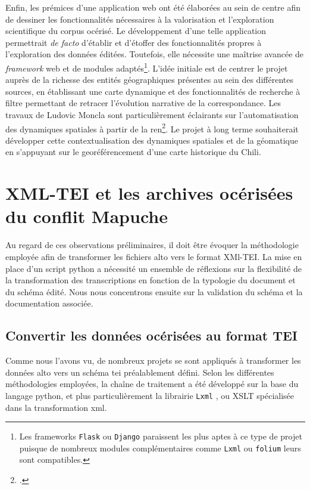 	Enfin, les prémices d'une application web ont été élaborées au sein de centre afin de dessiner les fonctionnalités nécessaires à la valorisation et l'exploration scientifique du corpus océrisé. Le développement d'une telle application permettrait \textit{de facto} d'établir et d'étoffer des fonctionnalités propres à l'exploration des données éditées. Toutefois, elle nécessite une maîtrise avancée de \textit{framework} web et de modules adaptés\footnote{Les frameworks \texttt{Flask} ou \texttt{Django} paraissent les plus aptes à ce type de projet puisque de nombreux modules complémentaires comme \texttt{Lxml} ou \texttt{folium} leurs sont compatibles.}. L'idée initiale est de centrer le projet auprès de la richesse des entités géographiques présentes au sein des différentes sources, en établissant une carte dynamique et des fonctionnalités de recherche à filtre permettant de retracer l'évolution narrative de la correspondance. Les travaux de Ludovic Moncla sont particulièrement éclairants sur l'automatisation des dynamiques spatiales à partir de la \gls{ren}\footcite{monclaAutomaticExtractionMethod2018}. Le projet à long terme souhaiterait développer cette contextualisation des dynamiques spatiales et de la géomatique en s'appuyant sur le georéférencement d'une carte historique du Chili.
	
	\section{XML-TEI et les archives océrisées du conflit Mapuche}
	
	Au regard de ces observations préliminaires, il doit être évoquer la méthodologie employée afin de transformer les fichiers \gls{alto} vers le format XMl-TEI. La mise en place d'un script python a nécessité un ensemble de réflexions sur la flexibilité de la transformation des transcriptions en fonction de la typologie du document et du schéma édité. Nous nous concentrons ensuite sur la validation du schéma et la documentation associée.
	
	\subsection{Convertir les données océrisées au format TEI} 
	
	Comme nous l'avons vu, de nombreux projets se sont appliqués à transformer les données \gls{alto} vers un schéma \gls{tei} préalablement défini. Selon les différentes méthodologies employées, la chaîne de traitement a été développé sur la base du langage python, et plus particulièrement la librairie \texttt{Lxml} , ou XSLT spécialisée dans la transformation \gls{xml}.
	
